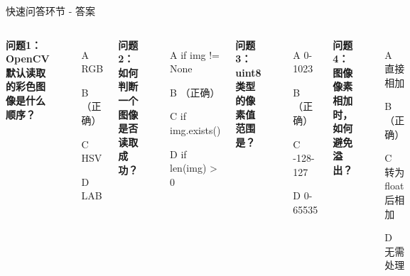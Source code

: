 \begin{frame}[fragile]{快速问答环节 - 答案}
    \begin{columns}
        \textbf{问题1：OpenCV默认读取的彩色图像是什么顺序？}
        \begin{itemize}
            \item[A] RGB
            \item[B] （正确）
            \item[C] HSV
            \item[D] LAB
        \end{itemize}

        \vspace{0.3cm}
        \textbf{问题2：如何判断一个图像是否读取成功？}
        \begin{itemize}
            \item[A] if img != None
            \item[B] （正确）
            \item[C] if img.exists()
            \item[D] if len(img) > 0
        \end{itemize}

        \textbf{问题3：uint8类型的像素值范围是？}
        \begin{itemize}
            \item[A] 0-1023
            \item[B] （正确）
            \item[C] -128-127
            \item[D] 0-65535
        \end{itemize}

        \vspace{0.3cm}
        \textbf{问题4：图像像素相加时，如何避免溢出？}
        \begin{itemize}
            \item[A] 直接相加
            \item[B] （正确）
            \item[C] 转为float后相加
            \item[D] 无需处理
        \end{itemize}
    \end{columns}

    \vspace{0.5cm}
    \begin{center}
    \end{center}
\end{frame}


